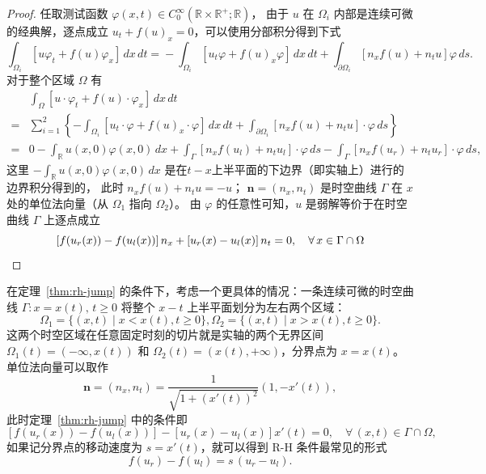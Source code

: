 \begin{proof}
    任取测试函数 $\varphi(x,t) \in C_0^\infty(\mathbb{R} \times \mathbb{R}^+;\mathbb{R})$，
    由于 $u$ 在 $\Omega_i$ 内部是连续可微的经典解，逐点成立 $u_t + f(u)_x = 0$，可以使用分部积分得到下式
    \[
        \int_{\Omega_i}[u \varphi_t + f(u) \varphi_x]\,dx\,dt
            ={}  - \int_{\Omega_i}
        [u_t \varphi + f(u)_x \varphi]\,dx\,dt
        + \int_{\partial \Omega_i}
        [ n_x f(u) + n_t u] \varphi\,ds.
    \]
    对于整个区域 $\Omega$ 有
    \begin{align*}
            & \int_{\Omega}[u \cdot \varphi_t + f(u) \cdot \varphi_x]\,dx\,dt
        \\
        ={} & \sum_{i=1}^2 \left\{
        - \int_{\Omega_i}
        [u_t \cdot \varphi + f(u)_x \cdot \varphi]\,dx\,dt
        + \int_{\partial \Omega_i}
        [ n_x f(u) + n_t u]\cdot \varphi\,ds
        \right\}
        \\
        ={} & 0  - \int_{\mathbb{R}} u(x,0)\varphi(x,0)\,dx + \int_{\Gamma}[ n_x f(u_l) + n_t u_l]\cdot \varphi\,ds
        - \int_{\Gamma}[ n_x f(u_r) + n_t u_r]\cdot \varphi\,ds,
    \end{align*}
    这里 $- \int_{\mathbb{R}} u(x,0)\varphi(x,0)\,dx$ 是在$t\!-\!x$上半平面的下边界（即实轴上）进行的边界积分得到的，
    此时 $n_x f(u) + n_t u = - u$；
    $\bm{n}=(n_x,n_t)$ 是时空曲线 $\Gamma$ 在 $x$ 处的单位法向量（从 $\Omega_1$ 指向 $\Omega_2$）。
    由 $\varphi$ 的任意性可知，$u$ 是弱解等价于在时空曲线 $\Gamma$ 上逐点成立
    \[
        \left[f(u_r(x)) - f(u_l(x))\right]n_x +
        \left[u_r(x) - u_l(x)\right]n_t = 0, \quad \forall\, x \in \Gamma \cap \Omega \qedhere
    \]
\end{proof}

在定理~\ref{thm:rh-jump} 的条件下，考虑一个更具体的情况：一条连续可微的时空曲线 $\Gamma: x=x(t),\, t \ge 0$ 将整个 $x-t$ 上半平面划分为左右两个区域：
\[
    \Omega_1 = \{(x,t) \mid x < x(t), t \ge 0\},
    \Omega_2 = \{(x,t) \mid x > x(t), t \ge 0\}.
\]
这两个时空区域在任意固定时刻的切片就是实轴的两个无界区间 $\Omega_1(t) =(-\infty,x(t))$ 和 $\Omega_2(t) = (x(t),+\infty)$，分界点为 $x=x(t)$。
单位法向量可以取作
\[
    \bm{n} = (n_x,n_t) = \frac{1}{\sqrt{1+(x'(t))^2}} (1,-x'(t)),
\]
此时定理~\ref{thm:rh-jump} 中的条件即
\[
    \left[f(u_r(x)) - f(u_l(x))\right] - \left[u_r(x) - u_l(x)\right]x'(t) = 0, \quad \forall\, (x,t) \in \Gamma \cap \Omega,
\]
如果记分界点的移动速度为 $s = x'(t)$，就可以得到 R-H 条件最常见的形式
\begin{equation}
    f(u_r) - f(u_l) = s\,(u_r - u_l).\label{eq:rh-jump}
\end{equation}


